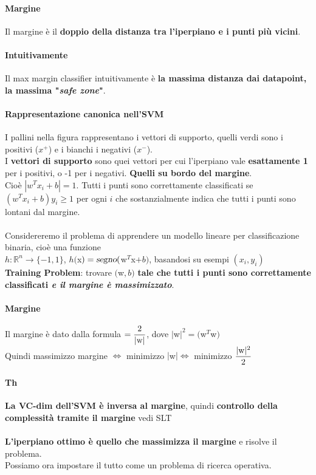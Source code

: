 \documentclass[10pt]{book}
\begin{document}
\paragraph{Margine} Il margine è il \textbf{doppio della distanza tra l'iperpiano e i punti più vicini}.
\paragraph{Intuitivamente} Il max margin classifier intuitivamente è \textbf{la massima distanza dai datapoint, la massima "\textit{safe zone}"}.
\paragraph{Rappresentazione canonica nell'SVM} I pallini nella figura rappresentano i vettori di supporto, quelli verdi sono i positivi ($x^+$) e i bianchi i negativi ($x^-$).\\
I \textbf{vettori di supporto} sono quei vettori per cui l'iperpiano vale \textbf{esattamente 1} per i positivi, o -1 per i negativi. \textbf{Quelli su bordo del margine}.\\Cioè $|w^Tx_i + b| = 1$. Tutti i punti sono correttamente classificati se $(w^Tx_i + b)y_i \geq 1$ per ogni $i$ che sostanzialmente indica che tutti i punti sono lontani dal margine.\\\\
Considereremo il problema di apprendere un modello lineare per classificazione binaria, cioè una funzione\\$h : \mathbb{R}^n \rightarrow \{-1, 1\}$, $h($x$) = \textsl{segno}($w$^T$x$ + b)$, basandosi su esempi $(x_i, y_i)$\\
\textbf{Training Problem}: trovare $($w$, b)$ \textbf{tale che tutti i punti sono correttamente classificati \textit{e il margine è massimizzato}}.
\paragraph{Margine} Il margine è dato dalla formula $= \mathlarger{\frac{2}{|\text{w}|}}$, dove $|$w$|^2 = ($w$^T$w$)$\\
Quindi massimizzo margine $\Leftrightarrow$ minimizzo $|$w$| \Leftrightarrow$ minimizzo $\mathlarger{\frac{|\text{w}|^2}{2}}$
\paragraph{Th} \textbf{La VC-dim dell'SVM è inversa al margine}, quindi \textbf{controllo della complessità tramite il margine} vedi SLT\\\\
\textbf{L'iperpiano ottimo è quello che massimizza il margine} e risolve il problema.\\
Possiamo ora impostare il tutto come un problema di ricerca operativa.
\end{document}
